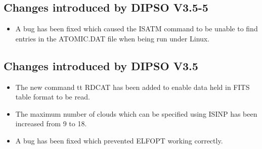 \documentclass[twoside,11pt,noabs,nolof]{starlink}
\begin{document}
\subsection{Changes introduced by DIPSO V3.5-5}
\begin{itemize}
\item A bug has been fixed which caused the ISATM command to be unable to
find entries in the ATOMIC.DAT file when being run under Linux.
\end{itemize}

\subsection{Changes introduced by DIPSO V3.5}
\begin{itemize}
\item The new command {tt RDCAT} has been added to enable data held in FITS
table format to be read.
\item The maximum number of clouds which can be specified using ISINP has
been increased from 9 to 18.
\item A bug has been fixed which prevented ELFOPT working correctly.
\end{itemize}
\end{document}
